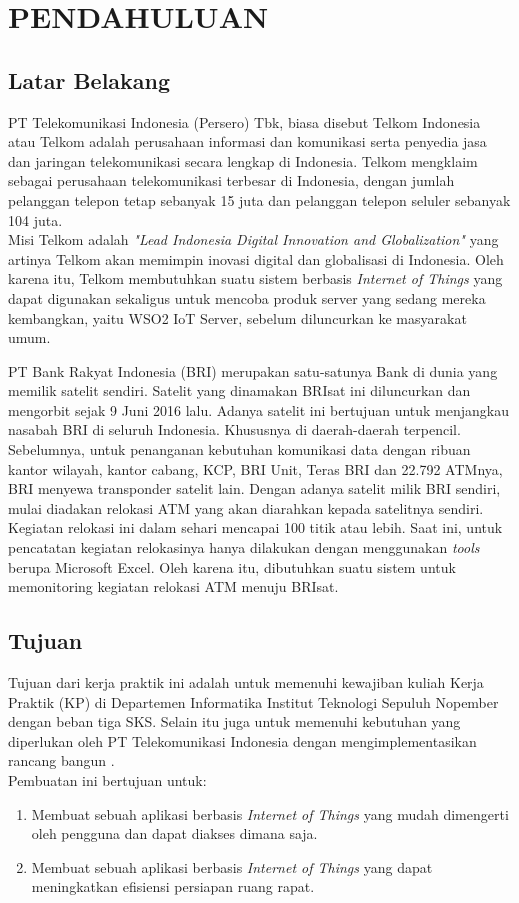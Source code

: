 \chapter{PENDAHULUAN}

\section{Latar Belakang}
\tab PT Telekomunikasi Indonesia (Persero) Tbk, biasa disebut Telkom Indonesia atau Telkom adalah perusahaan informasi dan komunikasi serta penyedia jasa dan jaringan telekomunikasi secara lengkap di Indonesia. Telkom mengklaim sebagai perusahaan telekomunikasi terbesar di Indonesia, dengan jumlah pelanggan telepon tetap sebanyak 15 juta dan pelanggan telepon seluler sebanyak 104 juta.\\
\tab Misi Telkom adalah \textit{"Lead Indonesia Digital Innovation and Globalization"} yang artinya Telkom akan memimpin inovasi digital dan globalisasi di Indonesia. 
\tab Oleh karena itu, Telkom membutuhkan suatu sistem berbasis \textit{Internet of Things} yang dapat digunakan sekaligus untuk mencoba produk server yang sedang mereka kembangkan, yaitu WSO2 IoT Server, sebelum diluncurkan ke masyarakat umum. 

\tab PT Bank Rakyat Indonesia (BRI) merupakan satu-satunya Bank di dunia yang memilik satelit sendiri. Satelit yang dinamakan BRIsat ini diluncurkan dan mengorbit sejak 9 Juni 2016 lalu. Adanya satelit ini bertujuan untuk menjangkau nasabah BRI di seluruh Indonesia. Khususnya di daerah-daerah terpencil.
\tab Sebelumnya, untuk penanganan kebutuhan komunikasi data dengan ribuan kantor wilayah, kantor cabang, KCP, BRI Unit, Teras BRI dan 22.792 ATMnya, BRI menyewa transponder satelit lain. Dengan adanya satelit milik BRI sendiri, mulai diadakan relokasi ATM yang akan diarahkan kepada satelitnya sendiri.\\
\tab Kegiatan relokasi ini dalam sehari mencapai 100 titik atau lebih. Saat ini, untuk pencatatan kegiatan relokasinya hanya dilakukan dengan menggunakan \textit{tools} berupa Microsoft Excel. Oleh karena itu, dibutuhkan suatu sistem untuk memonitoring kegiatan relokasi ATM menuju BRIsat.

\section{Tujuan}
\tab Tujuan dari kerja praktik ini adalah untuk memenuhi kewajiban kuliah Kerja Praktik (KP) di Departemen Informatika Institut Teknologi Sepuluh Nopember dengan beban tiga SKS. Selain itu juga untuk memenuhi kebutuhan yang diperlukan oleh PT Telekomunikasi Indonesia dengan mengimplementasikan rancang bangun \sistem.\\
\tab Pembuatan \sistemSpasi ini bertujuan untuk:
\begin{enumerate}
	\item Membuat sebuah aplikasi berbasis \textit{Internet of Things} yang mudah dimengerti oleh pengguna dan dapat diakses dimana saja.
	\item Membuat sebuah aplikasi berbasis \textit{Internet of Things} yang dapat meningkatkan efisiensi persiapan ruang rapat.
\end{enumerate}

